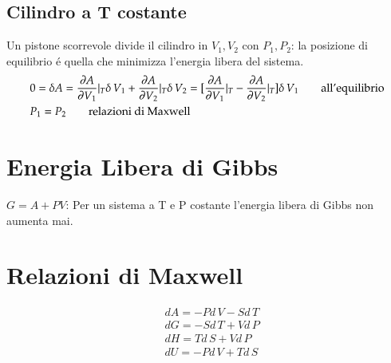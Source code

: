            \subsection{Cilindro a T costante}
            Un pistone scorrevole divide il cilindro in $V_1,V_2$ con $P_1,P_2$: la posizione di equilibrio \'e quella che minimizza l'energia libera del sistema.
            \begin{align*}
            &0=\delta A=\PDy{V_1}{A}|_T\delta\,V_1+\PDy{V_2}{A}|_T\delta\,V_2=[\PDy{V_1}{A}|_T-\PDy{V_2}{A}|_T]\delta\,V_1\tag*{all'equilibrio}\\
            &P_1=P_2\tag*{relazioni di Maxwell}
            \end{align*}
        \section{Energia Libera di Gibbs}
            $G=A+PV$: Per un sistema a T e P costante l'energia libera di Gibbs non aumenta mai.
        \section{Relazioni di Maxwell}
            \begin{minipage}{0.39\textwidth}
            \begin{align*}
                &dA=-Pd\,V-Sd\,T\\
                &dG=-Sd\,T+Vd\,P\\
                &dH=Td\,S+Vd\,P\\
                &dU=-Pd\,V+Td\,S
            \end{align*}
            \end{minipage}
            \begin{minipage}{0.6\textwidth}
            \end{minipage}
